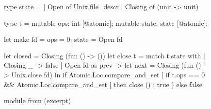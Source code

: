\begin{figure}[t!]
\begin{ocamlcode}
type state =
  | Open of Unix.file_descr
  | Closing of (unit -> unit)

type t =
  { mutable ops: int [@atomic];
    mutable state: state [@atomic]; }

let make fd = { ops = 0; state = Open fd }

let closed = Closing (fun () -> ())
let close t =
  match t.state with
  | Closing _ -> false
  | Open fd as prev ->
      let next = Closing (fun () -> Unix.close fd) in
      if Atomic.Loc.compare_and_set [%
        if t.ops == 0
        && Atomic.Loc.compare_and_set [%
        then close () ;
        true
      ) else false
\end{ocamlcode}
\caption{ module from \Eio (excerpt)}
\label{fig:rcfd}
\end{figure}
